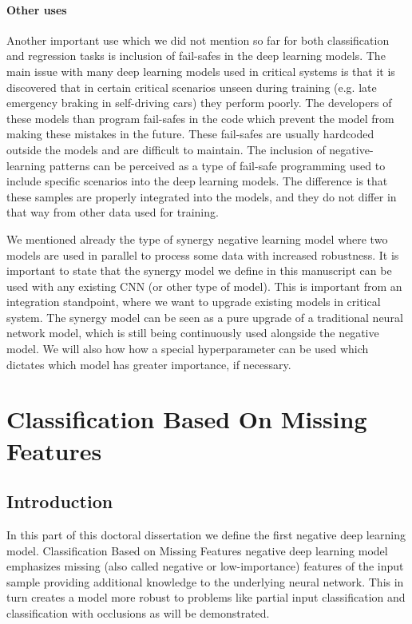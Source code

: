 \documentclass[b5paper]{book}
\begin{document}
\subsection{Other uses}

Another important use which we did not mention so far for both classification and regression tasks is inclusion of fail-safes in the deep learning models. The main issue with many deep learning models used in critical systems is that it is discovered that in certain critical scenarios unseen during training (e.g. late emergency braking in self-driving cars) they perform poorly. The developers of these models than program fail-safes in the code which prevent the model from making these mistakes in the future. These fail-safes are usually hardcoded outside the models and are difficult to maintain. The inclusion of negative-learning patterns can be perceived as a type of fail-safe programming used to include specific scenarios into the deep learning models. The difference is that these samples are properly integrated into the models, and they do not differ in that way from other data used for training.

We mentioned already the type of synergy negative learning model where two models are used in parallel to process some data with increased robustness. It is important to state that the synergy model we define in this manuscript can be used with any existing CNN (or other type of model). This is important from an integration standpoint, where we want to upgrade existing models in critical system. The synergy model can be seen as a pure upgrade of a traditional neural network model, which is still being continuously used alongside the negative model. We will also how how a special hyperparameter can be used which dictates which model has greater importance, if necessary.

\part{Classification Based On Missing Features}
\chapter{Introduction}

In this part of this doctoral dissertation we define the first negative deep learning model. Classification Based on Missing Features negative deep learning model emphasizes missing (also called negative or low-importance) features of the input sample providing additional knowledge to the underlying neural network. This in turn creates a model more robust to problems like partial input classification and classification with occlusions as will be demonstrated.
\end{document}
